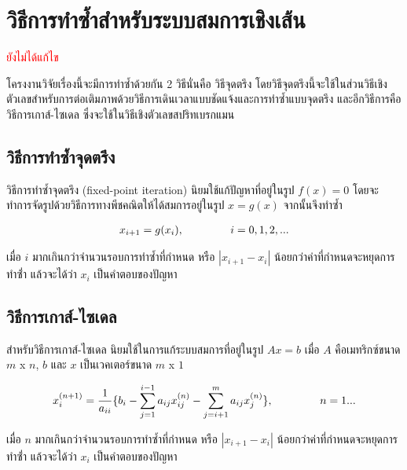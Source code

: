 \section{วิธีการทำซ้ำสำหรับระบบสมการเชิงเส้น}

\textcolor{red}{ยังไม่ได้แก้ไข}

\hspace{1cm} โครงงานวิจัยเรื่องนี้จะมีการทำซ้ำด้วยกัน 2 วิธีนั่นคือ วิธีจุดตรึง โดยวิธีจุดตรึงนี้จะใช้ในส่วนวิธีเชิงตัวเลขสำหรับการต่อเติมภาพด้วยวิธีการเดินเวลาแบบชัดแจ้งและการทำซ้ำแบบจุดตรึง และอีกวิธีการคือวิธีการเกาส์-ไซเดล ซึ่งจะใช้ในวิธีเชิงตัวเลขสปริทเบรกแมน 

\subsection{วิธีการทำซ้ำจุดตรึง}
\hspace{1cm} วิธีการทำซ้ำจุดตรึง (fixed-point iteration) นิยมใช้แก้ปัญหาที่อยู่ในรูป $f(x) = 0$ โดยจะทำการจัดรูปด้วยวิธีการทางพีชคณิตให้ได้สมการอยู่ในรูป $x = g(x)$ จากนั้นจึงทำซ้ำ

\begin{align*}
    x_{i+1} = g(x_i), \hspace{1.5cm} i=0,1,2,...
\end{align*}

เมื่อ $i$ มากเกินกว่าจำนวนรอบการทำซ้ำที่กำหนด หรือ $|x_{i+1} - x_{i}|$ น้อยกว่าค่าที่กำหนดจะหยุดการทำซ่้ำ แล้วจะได้ว่า $x_i$ เป็นคำตอบของปัญหา


\subsection{วิธีการเกาส์-ไซเดล}
\hspace{1cm} สำหรับวิธีการเกาส์-ไซเดล นิยมใช้ในการแก้ระบบสมการที่อยู่ในรูป $Ax=b$ เมื่อ $A$ คือเมทริกซ์ขนาด $m$ x $n$, $b$ และ $x$ เป็นเวคเตอร์ขนาด $m$ x $1$

\begin{align*}
    x_i^{(n+1)} = \frac{1}{a_{ii}} \{ b_i - \sum_{j=1}^{i-1} a_{ij} x_{ij}^{(n)} - \sum_{j=i+1}^{m} a_{ij}x_{j}^{(n)} \}, \hspace{1.5cm} n=1 ...
\end{align*}

เมื่อ $n$ มากเกินกว่าจำนวนรอบการทำซ้ำที่กำหนด หรือ $|x_{i+1} - x_{i}|$ น้อยกว่าค่าที่กำหนดจะหยุดการทำซ่้ำ แล้วจะได้ว่า $x_i$ เป็นคำตอบของปัญหา
